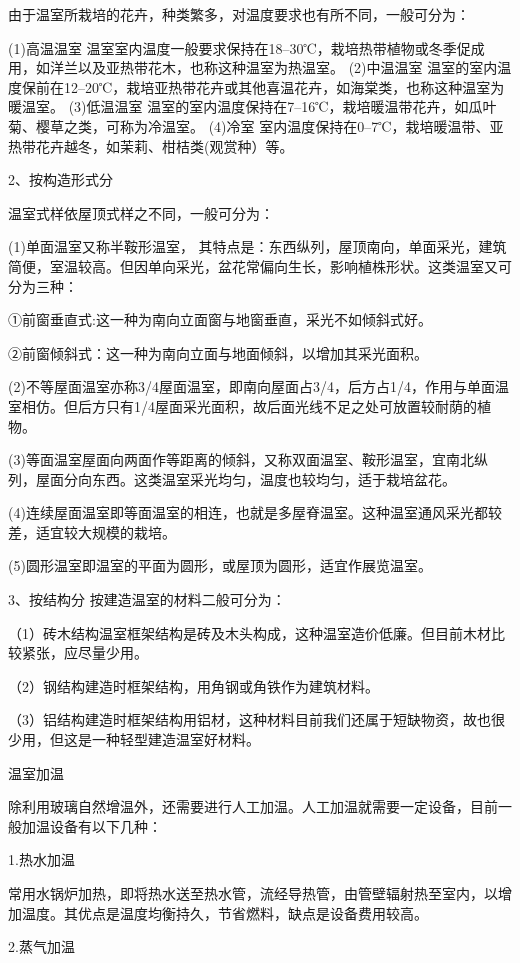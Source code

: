 \documentclass{ctexbook}
\begin{document}
由于温室所栽培的花卉，种类繁多，对温度要求也有所不同，一般可分为：

(1)高温温室 温室室内温度一般要求保持在18--30℃，栽培热带植物或冬季促成用，如洋兰以及亚热带花木，也称这种温室为热温室。
(2)中温温室 温室的室内温度保前在12--20℃，栽培亚热带花卉或其他喜温花卉，如海棠类，也称这种温室为暖温室。
(3)低温温室 温室的室内温度保持在7--16℃，栽培暖温带花卉，如瓜叶菊、樱草之类，可称为冷温室。
(4)冷室 室内温度保持在0--7℃，栽培暖温带、亚热带花卉越冬，如茉莉、柑桔类(观赏种）等。

2、按构造形式分

温室式样依屋顶式样之不同，一般可分为：

(1)单面温室又称半鞍形温室，
其特点是：东西纵列，屋顶南向，单面采光，建筑简便，室温较高。但因单向采光，盆花常偏向生长，影响植株形状。这类温室又可分为三种：

①前窗垂直式:这一种为南向立面窗与地窗垂直，采光不如倾斜式好。

②前窗倾斜式：这一种为南向立面与地面倾斜，以增加其采光面积。

(2)不等屋面温室亦称3/4屋面温室，即南向屋面占3/4，后方占1/4，作用与单面温室相仿。但后方只有1/4屋面采光面积，故后面光线不足之处可放置较耐荫的植物。

(3)等面温室屋面向两面作等距离的倾斜，又称双面温室、鞍形温室，宜南北纵列，屋面分向东西。这类温室采光均匀，温度也较均匀，适于栽培盆花。

(4)连续屋面温室即等面温室的相连，也就是多屋脊温室。这种温室通风采光都较差，适宜较大规模的栽培。

(5)圆形温室即温室的平面为圆形，或屋顶为圆形，适宜作展览温室。

3、按结构分
按建造温室的材料二般可分为：

（1）砖木结构温室框架结构是砖及木头构成，这种温室造价低廉。但目前木材比较紧张，应尽量少用。

（2）钢结构建造时框架结构，用角钢或角铁作为建筑材料。

（3）铝结构建造时框架结构用铝材，这种材料目前我们还属于短缺物资，故也很少用，但这是一种轻型建造温室好材料。

温室加温

除利用玻璃自然增温外，还需要进行人工加温。人工加温就需要一定设备，目前一般加温设备有以下几种：

1.热水加温

常用水锅炉加热，即将热水送至热水管，流经导热管，由管壁辐射热至室内，以增加温度。其优点是温度均衡持久，节省燃料，缺点是设备费用较高。

2.蒸气加温
\end{document}
